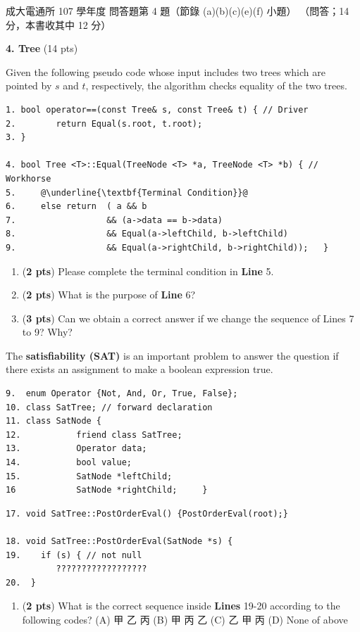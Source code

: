 \begin{pastexam}[label={px:ncku-107-cce-08}]{成大電通所 107 學年度 問答題第 4 題（節錄 (a)(b)(c)(e)(f) 小題）}
（問答；14 分，本書收其中 12 分）

\textbf{4. Tree} (14 pts)

Given the following pseudo code whose input includes two trees which are pointed by $s$ and $t$,
respectively, the algorithm checks equality of the two trees.
\begin{verbatim}
1. bool operator==(const Tree& s, const Tree& t) { // Driver
2.        return Equal(s.root, t.root);
3. }

4. bool Tree <T>::Equal(TreeNode <T> *a, TreeNode <T> *b) { // Workhorse
5.     @\underline{\textbf{Terminal Condition}}@
6.     else return  ( a && b
7.                  && (a->data == b->data)
8.                  && Equal(a->leftChild, b->leftChild)
9.                  && Equal(a->rightChild, b->rightChild));   }
\end{verbatim}
\begin{enumerate}[label=\alph*.]
\item (\textbf{2 pts}) Please complete the terminal condition in \textbf{Line} 5.
\item (\textbf{2 pts}) What is the purpose of \textbf{Line} 6?
\item (\textbf{3 pts}) Can we obtain a correct answer if we change the sequence of Lines 7 to 9? Why?
\end{enumerate}

The \textbf{satisfiability (SAT)} is an important problem to answer the question if there exists an
assignment to make a boolean expression true.
\begin{verbatim}
9.  enum Operator {Not, And, Or, True, False};
10. class SatTree; // forward declaration
11. class SatNode {
12.           friend class SatTree;
13.           Operator data;
14.           bool value;
15.           SatNode *leftChild;
16            SatNode *rightChild;     }
\end{verbatim}
\begin{verbatim}
17. void SatTree::PostOrderEval() {PostOrderEval(root);}

18. void SatTree::PostOrderEval(SatNode *s) {
19.    if (s) { // not null
          ??????????????????
20.  }
\end{verbatim}
\begin{enumerate}[label=\alph*.,start=5]
\item (\textbf{2 pts}) What is the correct sequence inside \textbf{Lines} 19-20 according to the following
codes? (A) 甲 乙 丙 (B) 甲 丙 乙 (C) 乙 甲 丙 (D) None of above


\end{enumerate}
\end{pastexam}
